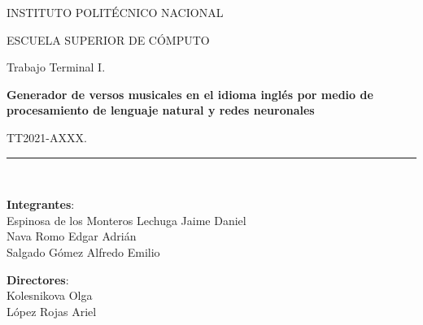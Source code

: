 \documentclass[12pt, a4paper, titlepage]{report}
\begin{document}
\begin{titlepage}
\vspace*{.25cm}								%
		
		\begin{center}
			
			\begin{LARGE}
				\textcolor{guindapoli}{INSTITUTO POLITÉCNICO NACIONAL}\\
			\end{LARGE}	
			
			\vspace*{0.2in}
			
			\begin{Large}
				\textcolor{azulescom}{ESCUELA SUPERIOR DE CÓMPUTO}\\
			\end{Large}		
			
			\vspace*{0.4in}
			
			\begin{large}
				Trabajo Terminal I.\\
			\end{large}
			
			\vspace*{0.2in}
			
			\begin{Large}
				\textbf{Generador de versos musicales en el idioma
inglés por medio de procesamiento de lenguaje
natural y redes neuronales}\\
			\end{Large}
			
			\vspace*{0.2in}
			
			\begin{large}
				TT2021-AXXX.\\
			\end{large}
			
			\vspace*{0.2in}
			
			\rule{80mm}{.1mm}\\
			\vspace*{0.1in}
			
			\begin{large}
				\begin{center}
					\textbf{Integrantes}:\\
					Espinosa de los Monteros Lechuga Jaime Daniel\\
					Nava Romo Edgar Adrián\\
					Salgado Gómez Alfredo Emilio\\
				\end{center}
			\end{large}
			
			\begin{large}
				\textbf{Directores}:\\
				Kolesnikova Olga\\
				López Rojas Ariel\\
			\end{large}
			
		\end{center}
	
	\end{titlepage}
\end{document}
